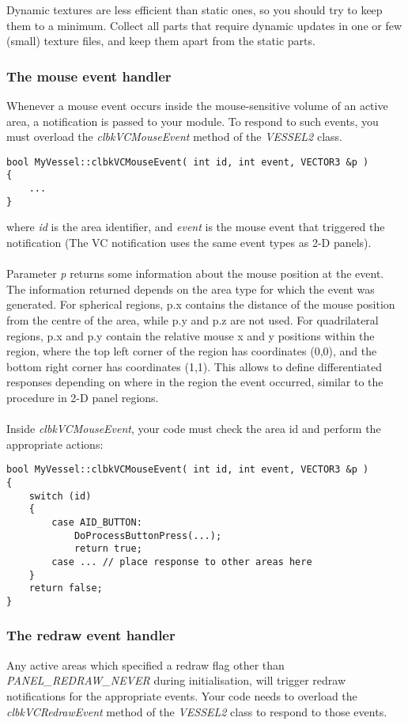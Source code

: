\documentclass[Orbiter Developer Manual.tex]{subfiles}
\begin{document}
\noindent
Dynamic textures are less efficient than static ones, so you should try to keep them to a minimum. Collect all parts that require dynamic updates in one or few (small) texture files, and keep them apart from the static parts.


\subsubsection{The mouse event handler}
Whenever a mouse event occurs inside the mouse-sensitive volume of an active area, a notification is passed to your module. To respond to such events, you must overload the \textit{clbkVCMouseEvent} method of the \textit{VESSEL2} class.

\begin{lstlisting}
bool MyVessel::clbkVCMouseEvent( int id, int event, VECTOR3 &p )
{
	...
}
\end{lstlisting}

\noindent
where \textit{id} is the area identifier, and \textit{event} is the mouse event that triggered the notification (The VC notification uses the same event types as 2-D panels).\\
\\
Parameter \textit{p} returns some information about the mouse position at the event. The information returned depends on the area type for which the event was generated. For spherical regions, p.x contains the distance of the mouse position from the centre of the area, while p.y and p.z are not used. For quadrilateral regions, p.x and p.y contain the relative mouse x and y positions within the region, where the top left corner of the region has coordinates (0,0), and the bottom right corner has coordinates (1,1). This allows to define differentiated responses depending on where in the region the event occurred, similar to the procedure in 2-D panel regions.\\
\\
Inside \textit{clbkVCMouseEvent}, your code must check the area id and perform the appropriate actions:

\begin{lstlisting}
bool MyVessel::clbkVCMouseEvent( int id, int event, VECTOR3 &p )
{
	switch (id)
	{
		case AID_BUTTON:
			DoProcessButtonPress(...);
			return true;
		case ... // place response to other areas here
	}
	return false;
}
\end{lstlisting}


\subsubsection{The redraw event handler}
Any active areas which specified a redraw flag other than \textit{PANEL\_REDRAW\_NEVER} during initialisation, will trigger redraw notifications for the appropriate events. Your code needs to overload the \textit{clbkVCRedrawEvent} method of the \textit{VESSEL2} class to respond to those events.
\end{document}
